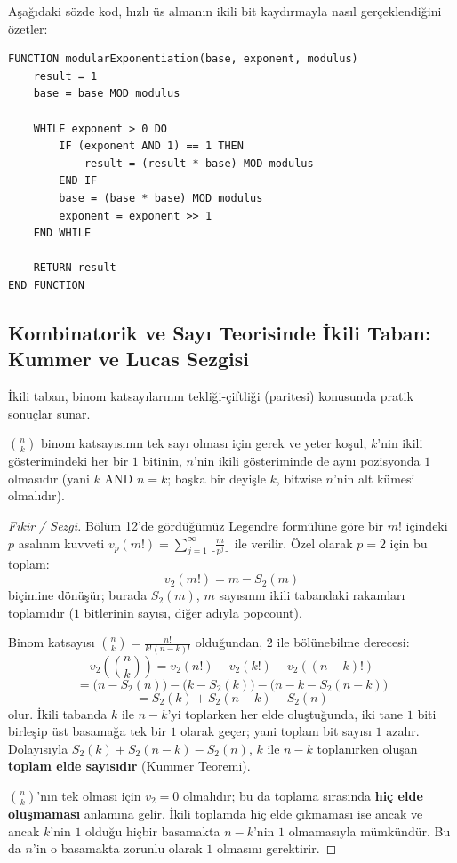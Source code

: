Aşağıdaki sözde kod, hızlı üs almanın ikili bit kaydırmayla nasıl gerçeklendiğini özetler:

\begin{lstlisting}
FUNCTION modularExponentiation(base, exponent, modulus)
    result = 1
    base = base MOD modulus

    WHILE exponent > 0 DO
        IF (exponent AND 1) == 1 THEN
            result = (result * base) MOD modulus
        END IF
        base = (base * base) MOD modulus
        exponent = exponent >> 1
    END WHILE

    RETURN result
END FUNCTION\end{lstlisting}

\subsection{Kombinatorik ve Sayı Teorisinde İkili Taban: Kummer ve Lucas Sezgisi}

İkili taban, binom katsayılarının tekliği-çiftliği (paritesi) konusunda pratik sonuçlar sunar.

\begin{theorem}
$\binom{n}{k}$ binom katsayısının tek sayı olması için gerek ve yeter koşul, $k$'nin ikili gösterimindeki her bir $1$ bitinin, $n$'nin ikili gösteriminde de aynı pozisyonda $1$ olmasıdır (yani $k \text{ AND } n = k$; başka bir deyişle $k$, bitwise $n$'nin alt kümesi olmalıdır).
\end{theorem}

\begin{proof}[Fikir / Sezgi]
Bölüm 12'de gördüğümüz Legendre formülüne göre bir $m!$ içindeki $p$ asalının kuvveti $v_p(m!) = \sum_{j=1}^\infty \lfloor \frac{m}{p^j} \rfloor$ ile verilir.
Özel olarak $p=2$ için bu toplam:
\[
v_2(m!) = m - S_2(m)
\]
biçimine dönüşür; burada $S_2(m)$, $m$ sayısının ikili tabandaki rakamları toplamıdır ($1$ bitlerinin sayısı, diğer adıyla popcount).

Binom katsayısı $\binom{n}{k} = \frac{n!}{k!(n-k)!}$ olduğundan, $2$ ile bölünebilme derecesi:
\[
v_2\left(\binom{n}{k}\right) = v_2(n!) - v_2(k!) - v_2((n-k)!)
\]
\[
= \big(n - S_2(n)\big) - \big(k - S_2(k)\big) - \big(n-k - S_2(n-k)\big)
\]
\[
= S_2(k) + S_2(n-k) - S_2(n)
\]
olur. İkili tabanda $k$ ile $n-k$'yi toplarken her elde oluştuğunda, iki tane $1$ biti birleşip üst basamağa tek bir $1$ olarak geçer; yani toplam bit sayısı $1$ azalır.
Dolayısıyla $S_2(k) + S_2(n-k) - S_2(n)$, $k$ ile $n-k$ toplanırken oluşan \textbf{toplam elde sayısıdır} (Kummer Teoremi).

$\binom{n}{k}$'nın tek olması için $v_2 = 0$ olmalıdır; bu da toplama sırasında \textbf{hiç elde oluşmaması} anlamına gelir. İkili toplamda hiç elde çıkmaması ise ancak ve ancak $k$'nin $1$ olduğu hiçbir basamakta $n-k$'nin $1$ olmamasıyla mümkündür. Bu da $n$'in o basamakta zorunlu olarak $1$ olmasını gerektirir.
\end{proof}

